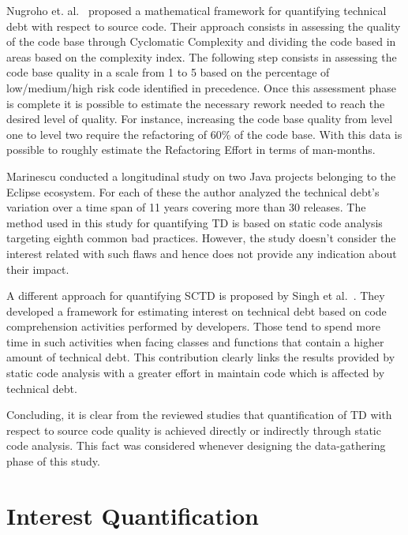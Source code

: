 Nugroho et. al.\ \cite{technicalDebtInterest} proposed a mathematical framework for quantifying technical debt with respect to source code. Their approach consists in assessing the quality of the code base through Cyclomatic Complexity \cite{cyclomatic_complexity} and dividing the code based in areas based on the complexity index. The following step consists in assessing the code base quality in a scale from 1 to 5 based on the percentage of low/medium/high risk code identified in precedence. Once this assessment phase is complete it is possible to estimate the necessary rework needed to reach the desired level of quality. For instance, increasing the code base quality from level one to level two require the refactoring of 60\% of the code base. With this data is possible to roughly estimate the Refactoring Effort in terms of man-months.

Marinescu \cite{assessing_technical_debt_eclipse} conducted a longitudinal study on two Java projects belonging to the Eclipse ecosystem. For each of these the author analyzed the technical debt's variation over a time span of 11 years covering more than 30 releases. The method used in this study for quantifying TD is based on static code analysis targeting eighth common bad practices. However, the study doesn't consider the interest related with such flaws and hence does not provide any indication about their impact.

A different approach for quantifying SCTD is proposed by Singh et al.\ \cite{code_td_comprehension_activities}. They developed a framework for estimating interest on technical debt based on code comprehension activities performed by developers. Those tend to spend more time in such activities when facing classes and functions that contain a higher amount of technical debt. This contribution clearly links the results provided by static code analysis with a greater effort in maintain code which is affected by technical debt.

Concluding, it is clear from the reviewed studies that quantification of TD with respect to source code quality is achieved directly or indirectly through static code analysis. This fact was considered whenever designing the data-gathering phase of this study.


\section{Interest Quantification}

